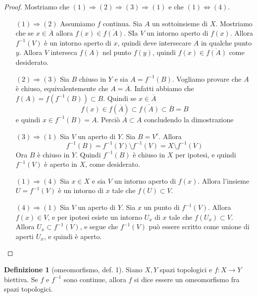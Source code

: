 \documentclass[10pt,a4paper]{article}
\theoremstyle{definition}
\newtheorem{defi}{Definizione}
\theoremstyle{plain}
\theoremstyle{remark}
\theoremstyle{remark}
\begin{document}
\begin{proof}
Mostriamo che $(1) \Rightarrow (2) \Rightarrow (3) \Rightarrow (1)$ e che $ (1) \Leftrightarrow (4)$.
\begin{itemize}
\item[$(1) \Rightarrow (2)$] Assumiamo $f$ continua. Sia $A$ un sottoinsieme di $X$. Mostriamo che se $x \in \overline{A}$ allora $f(x) \in \overline{f(A)}$. SIa $V$ un intorno aperto di $f(x)$. Allora $f^{-1}(V)$ è un intorno aperto di $x$, quindi deve intersecare $A$ in qualche punto $y$. Allora $V$ interseca $f(A)$ nel punto $f(y)$, quindi $f(x) \in \overline{f(A)}$ come desiderato.
\item[$(2) \Rightarrow (3)$] Sia $B$ chiuso in $Y$ e sia $A = f^{-1}(B)$. Vogliamo provare che $A$ è chiuso, equivalentemente che $A = \overline{A}$. Infatti abbiamo che $f(A)= f\left( f^{-1}(B) \right) \subset B$. Quindi se $x \in \overline{A}$ \[ f(x) \in f(\overline{A}) \subset \overline{f(A)} \subset \overline{B} = B \]
e quindi $x \in f^{-1}(B)=A$. Perciò $\overline{A} \subset A$ concludendo la dimostrazione
\item[$(3) \Rightarrow (1)$] Sia $V$ un aperto di $Y$. Sia $B = V^c$. Allora \[ f^{-1}(B) = f^{-1}(Y) \setminus f^{-1}(V) = X \setminus f^{-1}(V) \] Ora $B$ è chiuso in $Y$. Quindi $f^{-1}(B)$ è chiuso in  $X$ per ipotesi, e quindi $f^{-1}(V)$ è aperto in $X$, come desiderato.
\item[$(1) \Rightarrow (4)$] Sia $x \in X$ e sia $V $ un intorno aperto di $f(x)$. Allora l'insieme $U = f^{-1}(V)$ è un intorno di $x$ tale che $f(U) \subset V$.
\item[$(4) \Rightarrow (1)$] Sia $V$ un aperto di $Y$. Sia $x$ un punto di $f^{-1}(V)$. Allora $f(x) \in V$, e per ipotesi esiste un intorno $U_x$  di $x$ tale che $f(U_x) \subset V$. Allora $U_x \subset f^{-1}(V)$, e segue che $f^{-1}(V)$ può essere scritto come unione di aperti $U_x$, e quindi è aperto.
\end{itemize}
\end{proof}



\begin{defi}[omeomorfismo, def. 1] Siano $X,Y$ spazi topologici e $f: X \to Y$ biettiva. Se $f$ e $f^{-1}$ sono continue, allora $f$ si dice essere un omeomorfismo fra spazi topologici.
\end{defi}

\end{document}
